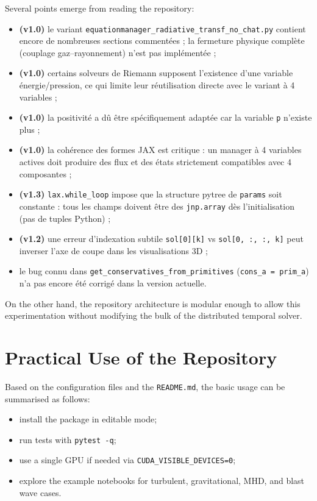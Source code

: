 \documentclass[a4paper, 11pt]{article}
\begin{document}
Several points emerge from reading the repository:
\begin{itemize}
    \item \textbf{(v1.0)} le variant \texttt{equationmanager\_radiative\_transf\_no\_chat.py} contient encore de nombreuses sections commentées ; la fermeture physique complète (couplage gaz--rayonnement) n'est pas implémentée ;
    \item \textbf{(v1.0)} certains solveurs de Riemann supposent l'existence d'une variable énergie/pression, ce qui limite leur réutilisation directe avec le variant à 4 variables ;
    \item \textbf{(v1.0)} la positivité a dû être spécifiquement adaptée car la variable \texttt{p} n'existe plus ;
    \item \textbf{(v1.0)} la cohérence des formes JAX est critique : un manager à 4 variables actives doit produire des flux et des états strictement compatibles avec 4 composantes ;
    \item \textbf{(v1.3)} \texttt{lax.while\_loop} impose que la structure pytree de \texttt{params} soit constante : tous les champs doivent être des \texttt{jnp.array} dès l'initialisation (pas de tuples Python) ;
    \item \textbf{(v1.2)} une erreur d'indexation subtile \texttt{sol[0][k]} vs \texttt{sol[0, :, :, k]} peut inverser l'axe de coupe dans les visualisations 3D ;
    \item le bug connu dans \texttt{get\_conservatives\_from\_primitives} (\texttt{cons\_a = prim\_a}) n'a pas encore été corrigé dans la version actuelle.
\end{itemize}

On the other hand, the repository architecture is modular enough to allow this experimentation without modifying the bulk of the distributed temporal solver.

\section{Practical Use of the Repository}

Based on the configuration files and the \texttt{README.md}, the basic usage can be summarised as follows:
\begin{itemize}
    \item install the package in editable mode;
    \item run tests with \texttt{pytest -q};
    \item use a single GPU if needed via \texttt{CUDA\_VISIBLE\_DEVICES=0};
    \item explore the example notebooks for turbulent, gravitational, MHD, and blast wave cases.
\end{itemize}
\end{document}
